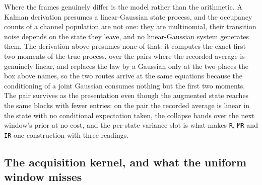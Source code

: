 \begin{appendixbox}
Where the frames genuinely differ is the model rather than the arithmetic. A Kalman derivation
presumes a linear-Gaussian state process, and the occupancy counts of a channel population are not
one: they are multinomial, their transition noise depends on the state they leave, and no
linear-Gaussian system generates them. The derivation above presumes none of that: it computes the
exact first two moments of the true process, over the pairs where the recorded average is genuinely
linear, and replaces the law by a Gaussian only at the two places the box above names, so the two
routes arrive at the same equations because the conditioning of a joint Gaussian consumes nothing
but the first two moments. The pair survives as the presentation even though the augmented state
reaches the same blocks with fewer entries: on the pair the recorded average is linear in
the state with no conditional expectation taken, the collapse hands over the next window's prior at
no cost, and the per-state variance slot is what makes \texttt{R}, \texttt{MR} and \texttt{IR} one
construction with three readings.

\subsection*{The acquisition kernel, and what the uniform window misses}


\end{appendixbox}
